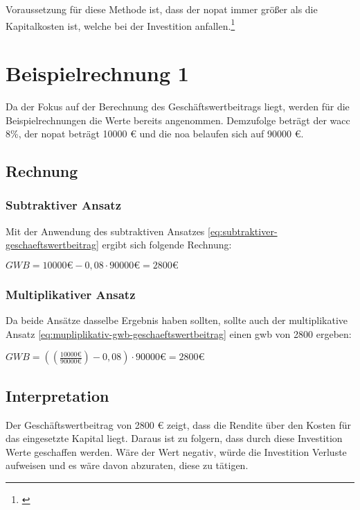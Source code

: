 \noindent
Voraussetzung für diese Methode ist, dass der \ac{nopat} immer größer als die Kapitalkosten ist, welche bei der Investition anfallen.\footnote{\cite{bwllexicon-eva}}

\section{Beispielrechnung 1}

Da der Fokus auf der Berechnung des Geschäftswertbeitrags liegt, werden für die Beispielrechnungen die Werte bereits angenommen. Demzufolge beträgt der \ac{wacc} 8\%, der \ac{nopat} beträgt 10000 € und die \ac{noa} belaufen sich auf 90000 €.

\subsection{Rechnung}

\subsubsection{Subtraktiver Ansatz}

Mit der Anwendung des subtraktiven Ansatzes \eqref{eq:subtraktiver-geschaeftswertbeitrag} ergibt sich folgende Rechnung:

\bigskip
$GWB = 10000 \text{€} - 0,08 \cdot 90000 \text{€} = 2800 \text{€}$


\subsubsection{Multiplikativer Ansatz}

Da beide Ansätze dasselbe Ergebnis haben sollten, sollte auch der multiplikative Ansatz \eqref{eq:mupliplikativ-gwb-geschaeftswertbeitrag} einen \ac{gwb} von 2800 ergeben:

\bigskip
$GWB = ((\frac{10000 \text{€}}{90000 \text{€}}) - 0,08) \cdot 90000 \text{€} = 2800 \text{€}$

\subsection{Interpretation}

Der Geschäftswertbeitrag von 2800 € zeigt, dass die Rendite über den Kosten für das eingesetzte Kapital liegt. Daraus ist zu folgern, dass durch diese Investition Werte geschaffen werden. Wäre der Wert negativ, würde die Investition Verluste aufweisen und es wäre davon abzuraten, diese zu tätigen.

